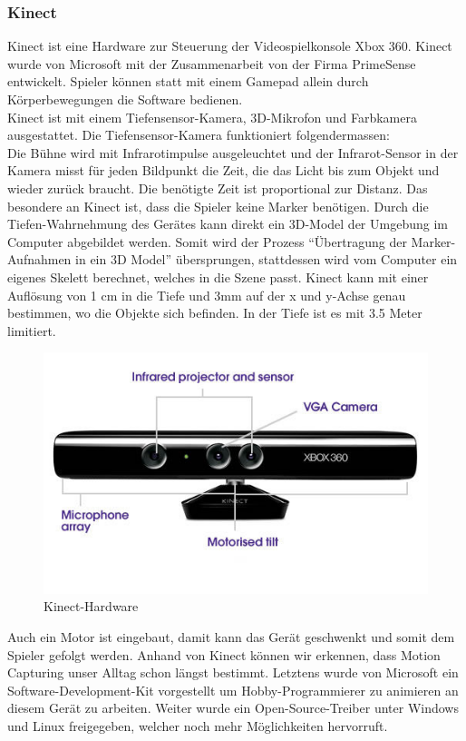 \subsubsection{Kinect}
\label{sec:kinect}
Kinect ist eine Hardware zur Steuerung der Videospielkonsole Xbox 360. Kinect wurde von Microsoft mit der Zusammenarbeit von der Firma PrimeSense entwickelt. Spieler können statt mit einem Gamepad allein durch Körperbewegungen die Software bedienen. \\
Kinect ist mit einem Tiefensensor-Kamera, 3D-Mikrofon und Farbkamera ausgestattet. Die Tiefensensor-Kamera funktioniert folgendermassen: \\
Die Bühne wird mit Infrarotimpulse ausgeleuchtet und der Infrarot-Sensor in der Kamera misst für jeden Bildpunkt die Zeit, die das Licht bis zum Objekt und wieder zurück braucht. Die benötigte Zeit ist proportional zur Distanz. Das besondere an Kinect ist, dass die Spieler keine Marker benötigen. Durch die Tiefen-Wahrnehmung des Gerätes kann direkt ein 3D-Model der Umgebung im Computer  abgebildet werden. Somit wird der Prozess ``Übertragung der Marker-Aufnahmen in ein 3D Model'' übersprungen, stattdessen wird vom Computer ein eigenes Skelett berechnet, welches in die Szene passt.  
Kinect kann mit einer Auflösung von 1 cm in die Tiefe und 3mm auf der x und y-Achse genau bestimmen, wo die Objekte sich befinden. In der Tiefe ist es mit 3.5 Meter limitiert. \\

\begin{figure}[hbtp]
\centering
\includegraphics[scale=0.5]{include/kinect.jpg}
\caption{Kinect-Hardware}
\end{figure}

Auch ein Motor ist eingebaut, damit kann das Gerät geschwenkt und somit dem Spieler gefolgt werden.
Anhand von Kinect können wir erkennen, dass Motion Capturing unser Alltag schon längst bestimmt. Letztens wurde von Microsoft ein Software-Development-Kit vorgestellt um Hobby-Programmierer zu animieren an diesem Gerät zu arbeiten. Weiter wurde ein Open-Source-Treiber unter Windows und Linux freigegeben, welcher noch mehr Möglichkeiten hervorruft.

